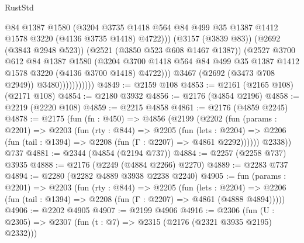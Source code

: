 \begin{lexlean}{RustStd}
\begin{coremodule}
{\begin{coremodule}
{{{{{{{{{{                                @84
                                @1387
                                @1580
                                (@3204
                                  @3735
                                  @1418
                                  @564
                                  @84
                                  @499
                                  @35
                                  @1387
                                  @1412
                                  @1578
                                  @3220
                                  (@4136 @3735 @1418)
                                  @4722)))
                            (@3157 (@3839 @83))
                            (@2692 (@3843 @2948 @523))
                            (@2521 (@3850 @523 @608 @1467 @1387))
                            (@2527
                              @3700
                              @612
                              @84
                              @1387
                              @1580
                              (@3204
                                @3700
                                @1418
                                @564
                                @84
                                @499
                                @35
                                @1387
                                @1412
                                @1578
                                @3220
                                (@4136 @3700 @1418)
                                @4722)))
                          @3467
                          (@2692 (@3473 @708 @2949))
                          @3480)))))))))))
@4849 := @2159 @108
@4853 := @2161 (@2165 @108) (@2171 @108)
@4854 := @2180 @3932
@4856 := @2176 (@4854 @2196)
@4858 := @2219 (@2220 @108)
@4859 := @2215 @4858
@4861 := @2176 (@4859 @2245)
@4878 := @2175
    (fun (fn : @450) =>
    @4856
      (@2199
        (@2202
          (fun (params : @2201) =>
          @2203
            (fun (rty : @844) =>
            @2205
              (fun (lets : @2204) =>
              @2206 (fun (tail : @1394) => @2208 (fun (Γ : @2207) => @4861 @2292))))))
        @2338))
    @737
@4881 := @2344 (@4854 (@2194 @737))
@4884 := @2257 (@2258 @737) @3935
@4888 := @2176 (@2249 (@4884 @2266) @2270)
@4889 := @2283 @737
@4894 := @2280 (@2282 @4889 @3938 @2238 @2240)
@4905 := fun (params : @2201) =>
  @2203
    (fun (rty : @844) =>
    @2205
      (fun (lets : @2204) =>
      @2206 (fun (tail : @1394) => @2208 (fun (Γ : @2207) => @4861 (@4888 @4894)))))
@4906 := @2202 @4905
@4907 := @2199 @4906
@4916 := @2306 (fun (U : @2305) => @2307 (fun (t : @7) => @2315 (@2176 (@2321 @3935 @2195) @2332)))
}}}}}}}}}}
\end{coremodule}}
\end{coremodule}
\end{lexlean}
